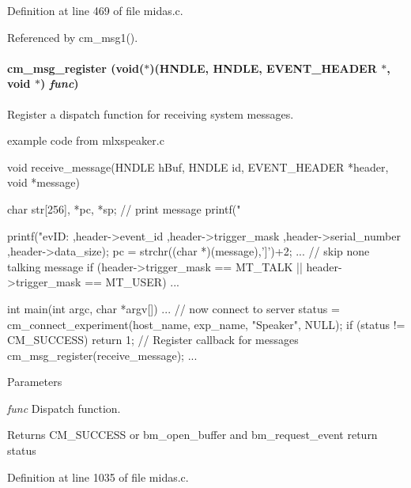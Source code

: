 Definition at line 469 of file midas.c.

Referenced by cm\_\-msg1().
\paragraph[{cm\_\-msg\_\-register}]{ cm\_\-msg\_\-register (void($\ast$)(HNDLE, HNDLE, {\bf EVENT\_\-HEADER} $\ast$, void $\ast$) {\em func})}\hfill\label{group__msgfunctionc_gab857885ee2ef24ddef12fb3ecf5c4c7e}
Register a dispatch function for receiving system messages.
\begin{DoxyItemize}
\item example code from mlxspeaker.c 
\begin{DoxyCode}
void receive_message(HNDLE hBuf, HNDLE id, EVENT_HEADER *header, void *message)
{
  char str[256], *pc, *sp;
  // print message
  printf("%

  printf("evID:%
                 ,header->event_id
                 ,header->trigger_mask
                 ,header->serial_number
                 ,header->data_size);
  pc = strchr((char *)(message),']')+2;
  ...
  // skip none talking message
  if (header->trigger_mask == MT_TALK ||
      header->trigger_mask == MT_USER)
   ...
}

int main(int argc, char *argv[])
{
  ...
  // now connect to server
  status = cm_connect_experiment(host_name, exp_name, "Speaker", NULL);
  if (status != CM_SUCCESS)
    return 1;
  // Register callback for messages
  cm_msg_register(receive_message);
  ...
}
\end{DoxyCode}
 
\begin{DoxyParams}{Parameters}
\item[{\em func}]Dispatch function. \end{DoxyParams}
\begin{DoxyReturn}{Returns}
CM\_\-SUCCESS or bm\_\-open\_\-buffer and bm\_\-request\_\-event return status 
\end{DoxyReturn}

\end{DoxyItemize}

Definition at line 1035 of file midas.c.
